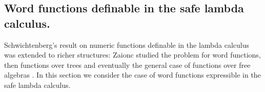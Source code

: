 \newcommand{\zaiwordtyp}{\mathbf{B}} %
\newcommand{\closedof}[1]{{\rm Cl}(#1)} %

\newcommand{\openedof}[2]{{\rm Op}(#1,#2)} %

\newcommand\wordnum[1]{\mathbf{#1}} %
\newcommand\safedefset{$\lambda^{{\rm safe}}${\rm def}}

\newcommand\fatlambda{\lambda\kern-0.7em\lambda}
\newcommand\wordapp{\mathop{app}}
\newcommand\wordsub{\mathop{sub}}


\subsection{Word functions definable in the safe lambda calculus.}
Schwichtenberg's result on numeric functions definable in the lambda
calculus was extended to richer structures: Zaionc studied the
problem for word functions, then functions over trees and
eventually the general case of functions over free algebras
\cite{DBLP:journals/tcs/Leivant93,DBLP:journals/apal/Zaionc91,DBLP:conf/aluacs/Zaionc88,DBLP:journals/tcs/Zaionc87,
zaionc:csl94}. In this section we consider the case of word
functions expressible in the safe lambda calculus.
\smallskip

